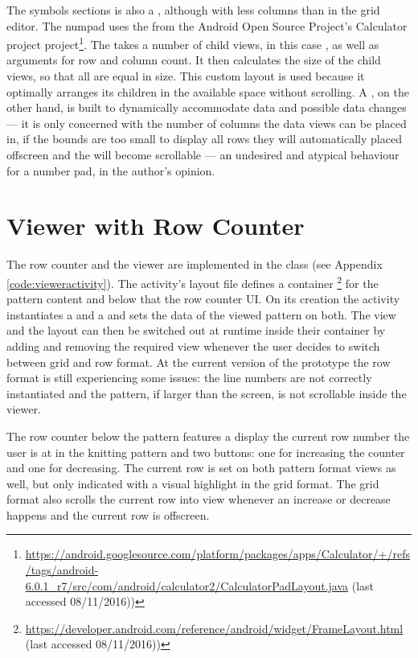 The symbols sections is also a , although with less columns than in the grid editor. The numpad uses the  from the Android Open Source Project's Calculator project project\footnote{\url{https://android.googlesource.com/platform/packages/apps/Calculator/+/refs/tags/android-6.0.1_r7/src/com/android/calculator2/CalculatorPadLayout.java} (last accessed 08/11/2016))}. The  takes a number of child views, in this case , as well as arguments for row and column count. It then calculates the size of the child views, so that all are equal in size. This custom layout is used because it optimally arranges its children in the available space without scrolling. A , on the other hand, is built to dynamically accommodate data and possible data changes --- it is only concerned with the number of columns the data views can be placed in, if the  bounds are too small to display all rows they will automatically placed offscreen and the  will become scrollable --- an undesired and atypical behaviour for a number pad, in the author's opinion.

\section{Viewer with Row Counter}
The row counter and the viewer are implemented in the  class (see Appendix \ref{code:vieweractivity}). The activity's layout file defines a container \footnote{\url{https://developer.android.com/reference/android/widget/FrameLayout.html} (last accessed 08/11/2016))} for the pattern content and below that the row counter \gls{UI}. On its creation the activity instantiates a  and a  and sets the data of the viewed pattern on both. The view and the layout can then be switched out at runtime inside their container by adding and removing the required view whenever the user decides to switch between grid and row format.
At the current version of the prototype the row format is still experiencing some issues: the line numbers are not correctly instantiated and the pattern, if larger than the screen, is not scrollable inside the viewer.

The row counter below the pattern features a display the current row number the user is at in the knitting pattern and two buttons: one for increasing the counter and one for decreasing. The current row is set on both pattern format views as well, but only indicated with a visual highlight in the grid format. The grid format also scrolls the current row into view whenever an increase or decrease happens and the current row is offscreen. 

